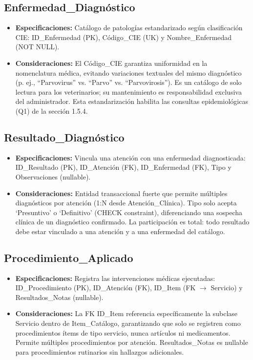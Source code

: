 \subsection{Enfermedad\_Diagnóstico}

\begin{itemize}
	\item \textbf{Especificaciones:} Catálogo de patologías estandarizado según clasificación CIE: ID\_Enfermedad (PK), Código\_CIE (UK) y Nombre\_Enfermedad (NOT NULL).
	\item \textbf{Consideraciones:} El Código\_CIE garantiza uniformidad en la nomenclatura médica, evitando variaciones textuales del mismo diagnóstico (p. ej., ``Parvovirus'' vs. ``Parvo'' vs. ``Parvovirosis''). Es un catálogo de solo lectura para los veterinarios; su mantenimiento es responsabilidad exclusiva del administrador. Esta estandarización habilita las consultas epidemiológicas (Q1) de la sección 1.5.4.
\end{itemize}

\subsection{Resultado\_Diagnóstico}

\begin{itemize}
	\item \textbf{Especificaciones:} Vincula una atención con una enfermedad diagnosticada: ID\_Resultado (PK), ID\_Atención (FK), ID\_Enfermedad (FK), Tipo y Observaciones (nullable).
	\item \textbf{Consideraciones:} Entidad transaccional fuerte que permite múltiples diagnósticos por atención (1:N desde Atención\_Clínica). Tipo solo acepta `Presuntivo' o `Definitivo' (CHECK constraint), diferenciando una sospecha clínica de un diagnóstico confirmado. La participación es total: todo resultado debe estar vinculado a una atención y a una enfermedad del catálogo.
\end{itemize}

\subsection{Procedimiento\_Aplicado}

\begin{itemize}
	\item \textbf{Especificaciones:} Registra las intervenciones médicas ejecutadas: ID\_Procedimiento (PK), ID\_Atención (FK), ID\_Item (FK $\rightarrow$ Servicio) y Resultados\_Notas (nullable).
	\item \textbf{Consideraciones:} La FK ID\_Item referencia específicamente la subclase Servicio dentro de Item\_Catálogo, garantizando que solo se registren como procedimientos ítems de tipo servicio, nunca artículos ni medicamentos. Permite múltiples procedimientos por atención. Resultados\_Notas es nullable para procedimientos rutinarios sin hallazgos adicionales.
\end{itemize}

